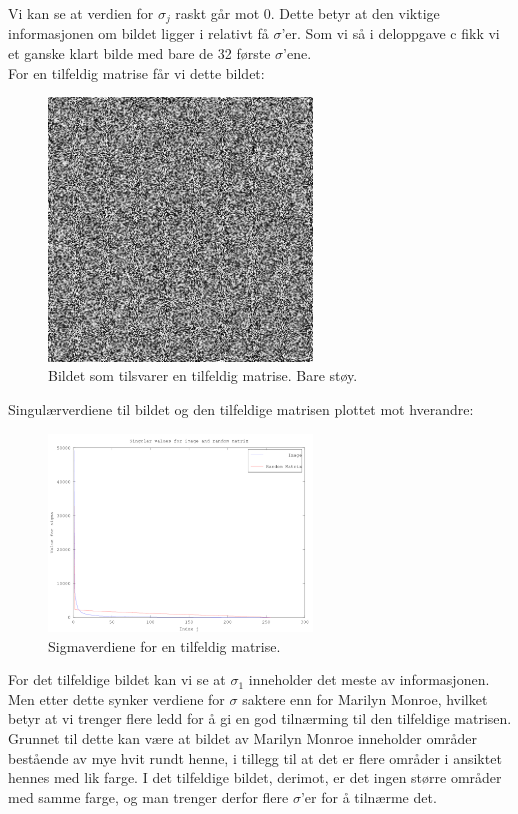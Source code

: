 \documentclass[a4paper,norsk, 10pt]{article}
\begin{document}
Vi kan se at verdien for $\sigma_j$ raskt går mot 0. Dette betyr at den viktige informasjonen om bildet ligger i relativt få $\sigma$'er. Som vi så i deloppgave c fikk vi et ganske klart bilde med bare de 32 første $\sigma$'ene.\\

For en tilfeldig matrise får vi dette bildet:

\begin{figure}[H]
\begin{center}
\includegraphics[width = 70mm]{randomPic.png}
\caption{Bildet som tilsvarer en tilfeldig matrise. Bare støy.}
\end{center}
\end{figure}

Singulærverdiene til bildet og den tilfeldige matrisen plottet mot hverandre:

\begin{figure}[H]
\begin{center}
\includegraphics[width = 70mm]{randomAndImage.png}
\caption{Sigmaverdiene for en tilfeldig matrise.}
\end{center}
\end{figure}

For det tilfeldige bildet kan vi se at $\sigma_1$ inneholder det meste av informasjonen. Men etter dette synker verdiene for $\sigma$ saktere enn for Marilyn Monroe, hvilket betyr at vi trenger flere ledd for å gi en god tilnærming til den tilfeldige matrisen. Grunnet til dette kan være at bildet av Marilyn Monroe inneholder områder bestående av mye hvit rundt henne, i tillegg til at det er flere områder i ansiktet hennes med lik farge. I det tilfeldige bildet, derimot, er det ingen større områder med samme farge, og man trenger derfor flere $\sigma$'er for å tilnærme det. 
\end{document}
